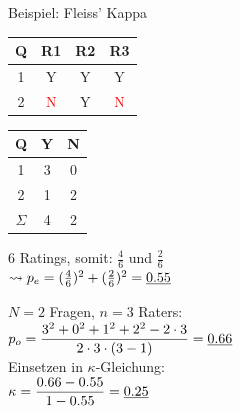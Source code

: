 \documentclass[usenames, dvipsnames, aspectratio=32]{beamer}
\begin{document}
\begin{frame}{Beispiel: Fleiss' Kappa}
    \begin{minipage}{.45\linewidth}
        \centering
        \begin{table}
            \begin{tabular}{c|ccc}
                \toprule
                \textbf{Q} & \textbf{R1} & \textbf{R2} & \textbf{R3} \\
                \midrule
                1 & \textcolor{green!70}{Y} & \textcolor{green!70}{Y} & \textcolor{green!70}{Y} \\
                2 & \textcolor{red}{N} & \textcolor{green!70}{Y} & \textcolor{red}{N} \\
                \bottomrule
            \end{tabular}
        \end{table}
        \vspace{-1em} 
        \begin{table}
            \begin{tabular}{c|cc}
                \toprule
                \textbf{Q} &\textbf{Y} & \textbf{N} \\
                \midrule
                1 & 3 & 0 \\
                2 & 1 & 2 \\
                \midrule
                $\Sigma$ & 4 & 2 \\
                \bottomrule
            \end{tabular}
        \end{table}
        6 Ratings, somit: $\frac{4}{6}$ und $\frac{2}{6}$ \vspace{.5em} \\
        $\rightsquigarrow p_e=(\frac{4}{6})^2 + (\frac{2}{6})^2=\uline{0.55}$ 
    \end{minipage}%
    \begin{minipage}{.53\linewidth}
        \centering
        $N=2$ Fragen, $n=3$ Raters: \vspace{.75em} \\
        $\displaystyle p_o=\frac{3^2+0^2+1^2+2^2-2\cdot 3}{2\cdot 3\cdot (3-1)}=\uline{0.66}$ \vspace{2em} \\
        Einsetzen in $\kappa$-Gleichung: \vspace{.75em} \\
        $\displaystyle\kappa=\frac{0.66 - 0.55}{1 - 0.55}=\uline{0.25}$
    \end{minipage}
\end{frame}
\end{document}
